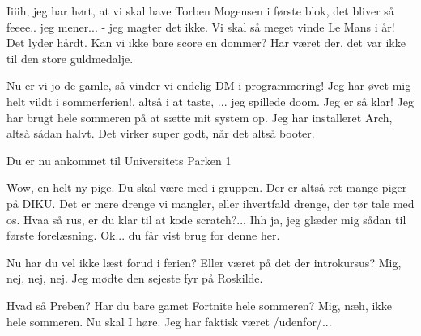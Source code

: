 \documentclass[a4paper,11pt]{article}
\begin{document}
\begin{sketch}


    Iiiih, jeg har hørt, at vi skal have Torben Mogensen i første blok, det bliver så feeee.. jeg mener... - jeg magter det ikke.
   Vi skal så meget vinde Le Mans i år!
   Det lyder hårdt. Kan vi ikke bare score en dommer?
   Har været der, det var ikke til den store guldmedalje.

   Nu er vi jo de gamle, så vinder vi endelig DM i programmering!
   Jeg har øvet mig helt vildt i sommerferien!, altså i at taste, ... jeg spillede doom.
   Jeg er så klar! Jeg har brugt hele sommeren på at sætte mit system op.
  Jeg har installeret Arch, altså sådan halvt. Det virker super godt, når det altså booter.

   Du er nu ankommet til Universitets Parken 1

   Wow, en helt ny pige. Du skal være med i gruppen.
   Der er altså ret mange piger på DIKU. Det er mere drenge vi mangler, eller ihvertfald drenge, der tør tale med os.
   Hvaa så rus, er du klar til at kode scratch?...
   Ihh ja, jeg glæder mig sådan til første forelæsning. 
   Ok... du får vist brug for denne her.

   Nu har du vel ikke læst forud i ferien?
   Eller været på det der introkursus?
   Mig, nej, nej, nej. Jeg mødte den sejeste fyr på Roskilde.

   Hvad så Preben? Har du bare gamet Fortnite hele sommeren?
   Mig, næh, ikke hele sommeren. Nu skal I høre. Jeg har faktisk været /udenfor/...
\end{sketch}
\end{document}
